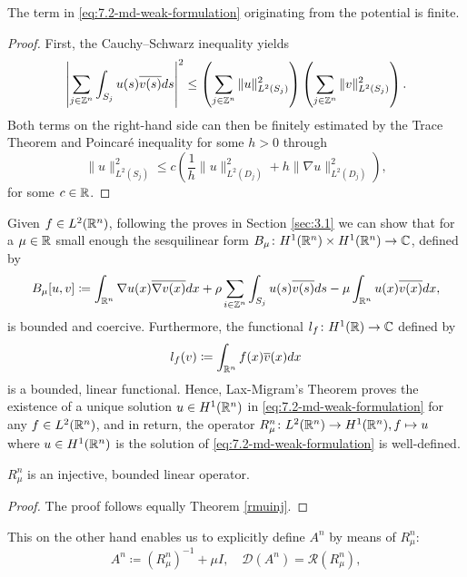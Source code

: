 \begin{remark} 
	The term in \eqref{eq:7.2-md-weak-formulation} originating from the potential is finite.
	
	\begin{proof}
	 First, the Cauchy–Schwarz inequality yields
	\[ \left| \sum_{j \in \mathbb{Z}^{n}} \int_{S_{j}} u(s) \overline{v(s)} ds \right|^{2} \leq \left( \sum_{j \in \mathbb{Z}^{n}} \| u \|_{L^{2}(S_{j})}^{2} \right) \left( \sum_{j \in \mathbb{Z}^{n}} \| v \|_{L^{2}(S_{j})}^{2} \right). \] 
	Both terms on the right-hand side can then be finitely estimated by the Trace Theorem \cite[p. 258]{evans1998partial} and Poincaré inequality for some $h > 0$ through
	\[ \| u \|_{L^{2}(S_{j})}^{2} \leq c \left( \frac{1}{h} \|u\|_{L^{2}(D_{j})}^{2} + h \| \nabla u \|_{L^{2}(D_{j})}^{2} \right), \]	
	for some $c \in \mathbb{R}$.
	\end{proof}
\end{remark}

Given $f \in L^{2}(\mathbb{R}^{n})$, following the proves in Section \ref{sec:3.1} we can show that for a $\mu \in \mathbb{R}$ small enough the sesquilinear form $B_{\mu} \colon H^{1}(\mathbb{R}^{n}) \times H^{1}(\mathbb{R}^{n}) \rightarrow \mathbb{C}$, defined by
\[ B_{\mu}[u, v] \coloneqq \int_{\mathbb{R}^{n}} \nabla u(x) \overline{\nabla v(x)} dx + \rho \sum_{i \in \mathbb{Z}^{n}} \int_{S_{j}} u(s) \overline{v(s)} ds - \mu \int_{\mathbb{R}^{n}} u(x) \overline{v(x)} dx, \]
 is  bounded and coercive. Furthermore, the functional $l_{f} \colon H^{1}(\mathbb{R}) \rightarrow \mathbb{C}$ defined by
	\[ l_{f}(v) \coloneqq \int_{\mathbb{R}^{n}} f(x) \overline{v}(x) dx \]
is a bounded, linear functional. Hence, Lax-Migram's Theorem proves the existence of a unique solution $u \in H^{1}(\mathbb{R}^{n})$ in \eqref{eq:7.2-md-weak-formulation} for any $f \in L^{2}(\mathbb{R}^{n})$, and in return, the operator $R_{\mu}^{n} \colon L^{2}(\mathbb{R}^{n}) \rightarrow H^{1}(\mathbb{R}^{n}), f \mapsto u$ where $u \in H^{1}(\mathbb{R}^{n})$ is the solution of \eqref{eq:7.2-md-weak-formulation} is well-defined. 

\begin{theorem} 
	$R_{\mu}^{n}$ is an injective, bounded linear operator. 
	
	\begin{proof}
		The proof follows equally Theorem \ref{rmuinj}.
	\end{proof}
\end{theorem}

This on the other hand enables us to explicitly define $A^{n}$ by means of $R_{\mu}^{n}$:
\[ A^{n} \coloneqq \left(R_{\mu}^{n}\right)^{-1} + \mu I, \quad \mathcal{D}(A^{n}) = \mathcal{R}(R_{\mu}^{n}), \]

